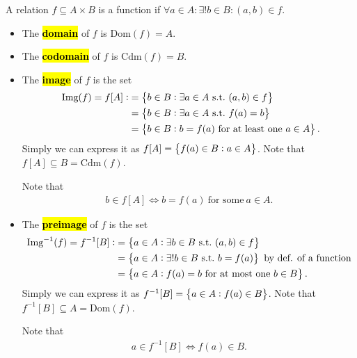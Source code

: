\documentclass[11pt,openany]{article}
\begin{document}
\begin{remark*}
	A relation $f\subseteq A\times B$ is a function if $\boxed{\forall a\in A:\exists! b\in B:(a,b)\in f.}$
	\begin{itemize}
		\item The \hl{\textbf{domain}} of $f$ is $\text{Dom}(f)=A$.
		\item The \hl{\textbf{codomain}} of $f$ is $\text{Cdm}(f)=B$.
		\item The \hl{\textbf{image}} of $f$ is the set \begin{align*}\
			\img{f}=f[A]:&=\set{b\in B:\exists a \in A\ \text{s.t.}\ (a,b)\in f}\\
			&=\set{b\in B:\exists a \in A\ \text{s.t.}\ f(a)=b}\\
			&=\set{b\in B: b = f(a)\ \text{for at least one}\ a\in A}.
		\end{align*} Simply we can express it as $f[A]=\set{f(a)\in B:a\in A}$. Note that $f[A]\subseteq B=\text{Cdm}(f)$. 
	
		Note that \begin{align*}
			b\in f[A]\iff b=f(a)\ \text{for some}\ a\in A.
		\end{align*}
		\item The \hl{\textbf{preimage}} of $f$ is the set \begin{align*}
			\preimg{f}=f^{-1}[B]:&=\set{a\in A:\exists b \in B\ \text{s.t.}\ (a,b)\in f}\\
			&=\set{a\in A:\exists! b \in B\ \text{s.t.}\ b=f(a)}\ \text{by def. of a function}\\
			&=\set{a\in A:f(a)=b\ \text{for at most one}\ b\in B}.
		\end{align*} Simply we can express it as $f^{-1}[B]=\set{a\in A:f(a)\in B}$. Note that $f^{-1}[B]\subseteq A=\text{Dom}(f)$.
	
		Note that \begin{align*}
		a\in f^{-1}[B]\iff f(a)\in B.
\end{align*}
	\end{itemize}
\end{remark*}
\end{document}
